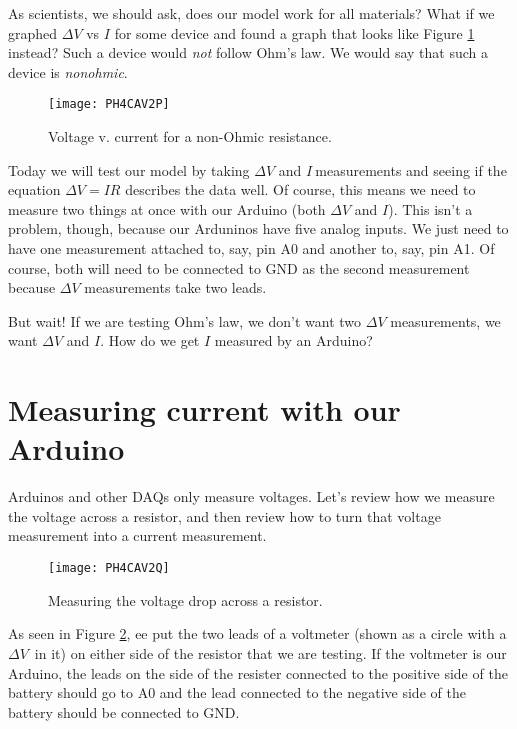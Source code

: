 As scientists, we should ask,
does our model work for all materials? What if we graphed $\Delta V$ vs $I$
for some device and found a graph that looks like Figure \ref{fig:nonohm}
instead?
Such a device would \emph{not}
follow Ohm's law. We would say that such a device is \emph{nonohmic}.
\begin{figure}[htbp!]
	\centering
\texttt{[image: PH4CAV2P]}
	\caption[Voltage v. current for a non-Ohmic resistance]{Voltage v.
	current for a non-Ohmic resistance.}
	\label{fig:nonohm}
\end{figure}

Today we will test our model by taking $\Delta V$ and $I\ $measurements and
seeing if the equation $\Delta V=IR$ describes the data well. Of course,
this means we need to measure two things at once with our Arduino
(both $\Delta V$ and $I$). This isn't a problem, though, 
because our Arduninos have
five analog inputs. We just need to have one measurement attached to,
say, pin A0 and another to, say, pin A1. Of course, both will need to be
connected to GND as the second measurement because $\Delta V$ measurements
take two leads.

But wait! If we are testing Ohm's law, we don't want two $\Delta V$
measurements, we want $\Delta V$ and $I.$ How do we get $I$ measured by an
Arduino?

\section{Measuring current with our Arduino}

Arduinos and other DAQs only measure voltages. Let's review how we measure
the voltage across a resistor, and then review how to turn that voltage
measurement into a current measurement.

\begin{figure}[htbp!]
	\centering
\texttt{[image: PH4CAV2Q]}
	\caption[Measuring the voltage drop across a resistor]{Measuring the
	voltage drop across a resistor.}
	\label{fig:vdrop}
\end{figure}
As seen in Figure \ref{fig:vdrop},
ee put the two leads of a
voltmeter (shown as a circle with a $\Delta V$\ in it) on either side of the
resistor that we are testing. If the voltmeter is our Arduino, the leads on
the side of the resister connected to the positive side of the battery
should go to A0 and the lead connected to the negative side of the battery
should be connected to GND. 

